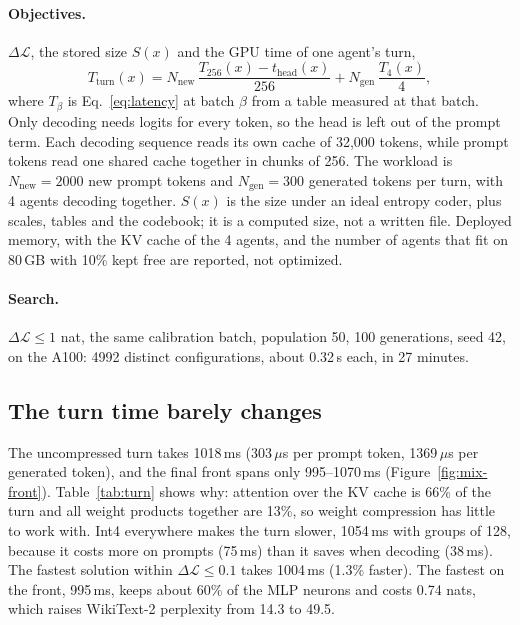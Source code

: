 \documentclass[11pt]{article}
\newcommand{\dloss}{\Delta\mathcal{L}}
\newcommand{\us}{\,$\mu$s}
\begin{document}
\paragraph{Objectives.}
$\dloss$, the stored size $S(x)$ and the GPU time of one agent's turn,
\begin{equation}
  T_{\text{turn}}(x) = N_{\text{new}}\,\frac{T_{256}(x)-t_{\text{head}}(x)}{256}
                     + N_{\text{gen}}\,\frac{T_{4}(x)}{4},
  \label{eq:turn}
\end{equation}
where $T_\beta$ is Eq.~\eqref{eq:latency} at batch $\beta$ from a table measured at that batch. Only
decoding needs logits for every token, so the head is left out of the prompt term. Each decoding
sequence reads its own cache of 32{,}000 tokens, while prompt tokens read one shared cache together in
chunks of 256. The workload is $N_{\text{new}}=2000$ new prompt tokens and $N_{\text{gen}}=300$ generated
tokens per turn, with 4 agents decoding together. $S(x)$ is the size under an ideal entropy coder, plus
scales, tables and the codebook; it is a computed size, not a written file. Deployed memory, with the KV
cache of the 4 agents, and the number of agents that fit on 80\,GB with 10\% kept free are reported, not
optimized.

\paragraph{Search.}
$\dloss\le1$ nat, the same calibration batch, population 50, 100 generations, seed 42, on the A100: 4992
distinct configurations, about 0.32\,s each, in 27 minutes.

\subsection{The turn time barely changes}
\label{sec:mix-time}
The uncompressed turn takes 1018\,ms (303\us{} per prompt token, 1369\us{} per generated token), and the
final front spans only 995--1070\,ms (Figure~\ref{fig:mix-front}). Table~\ref{tab:turn} shows why: attention
over the KV cache is 66\% of the turn and all weight products together are 13\%, so weight compression has
little to work with. Int4 everywhere makes the turn slower, 1054\,ms with groups of 128, because it costs
more on prompts (75\,ms) than it saves when decoding (38\,ms). The fastest solution within $\dloss\le0.1$
takes 1004\,ms (1.3\% faster). The fastest on the front, 995\,ms, keeps about 60\% of the MLP neurons and
costs 0.74 nats, which raises WikiText-2 perplexity from 14.3 to 49.5.
\end{document}
